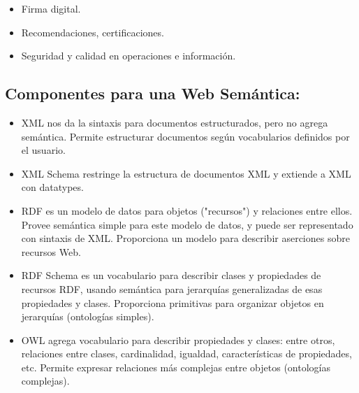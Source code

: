 \documentclass[a4paper,12pt,twoside,final,spanish]{article}
\begin{document}
\begin{itemize}
\item Firma digital.
\item Recomendaciones, certificaciones.
\item Seguridad y calidad en operaciones e información.
\end{itemize}

\subsection{Componentes para una Web Semántica:}

\begin{itemize}
\item XML nos da la sintaxis para documentos estructurados, pero no agrega semántica.  Permite estructurar documentos según vocabularios definidos por el usuario.
\item XML Schema restringe la estructura de documentos XML y extiende a XML con datatypes.
\item RDF es un modelo de datos para objetos ("recursos") y relaciones entre ellos. Provee semántica simple para este modelo de datos, y puede ser representado con sintaxis de XML. Proporciona un modelo para describir aserciones sobre recursos Web.
\item RDF Schema es un vocabulario para describir clases y propiedades de recursos RDF, usando semántica para jerarquías generalizadas de esas propiedades y clases.   Proporciona primitivas para organizar objetos en jerarquías (ontologías simples).
\item OWL agrega vocabulario para describir propiedades y clases: entre otros, relaciones entre clases, cardinalidad, igualdad, características de propiedades, etc. Permite expresar relaciones más complejas entre objetos (ontologías complejas).
\end{itemize}
\end{document}
